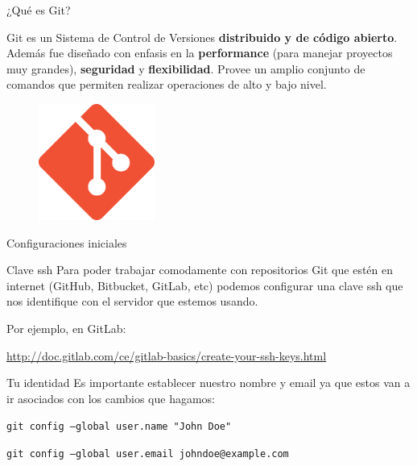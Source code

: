 \begin{frame}{¿Qué es Git?}

	\begin{block}{}
		Git es un Sistema de Control de Versiones \textbf{distribuido y de código abierto}.
        Además fue diseñado con enfasis en la \textbf{performance} (para manejar proyectos muy grandes), \textbf{seguridad} y \textbf{flexibilidad}.
        Provee un amplio conjunto de comandos que permiten realizar operaciones de alto y bajo nivel.
	\end{block}

    \begin{figure}[ht]
        \begin{center}
            \includegraphics[height=1.5in]{images/logo-git.png}
        \end{center}
    \end{figure}
\end{frame}

\begin{frame}[fragile]{Configuraciones iniciales}

	\begin{block}{Clave ssh}
		Para poder trabajar comodamente con repositorios Git que estén en internet (GitHub, Bitbucket, GitLab, etc) podemos configurar una clave ssh que nos identifique con el servidor que estemos usando.

        Por ejemplo, en GitLab:

        \url{http://doc.gitlab.com/ce/gitlab-basics/create-your-ssh-keys.html}
	\end{block}

    \begin{block}{Tu identidad}
        Es importante establecer nuestro nombre y email ya que estos van a ir asociados con los cambios que hagamos:

        \vspace{0.5em}

        \texttt{git config --global user.name "John Doe"}

        \texttt{git config --global user.email johndoe@example.com}
    \end{block}


\end{frame}

